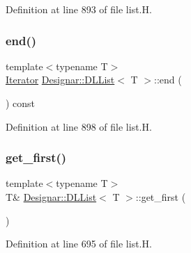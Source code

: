 Definition at line 893 of file list.\+H.

\mbox{\label{class_designar_1_1_d_l_list_a44bec24be9eb3b3bbfeadc28240a1650}} 
\subsubsection{\texorpdfstring{end()}{end()}\hspace{0.1cm}{\footnotesize\ttfamily [2/2]}}
{\footnotesize\ttfamily template$<$typename T$>$ \\
\hyperlink{class_designar_1_1_d_l_list_1_1_iterator}{Iterator} \hyperlink{class_designar_1_1_d_l_list}{Designar\+::\+D\+L\+List}$<$ T $>$\+::end (\begin{DoxyParamCaption}{ }\end{DoxyParamCaption}) const\hspace{0.3cm}{\ttfamily [inline]}}



Definition at line 898 of file list.\+H.

\mbox{\label{class_designar_1_1_d_l_list_aa089dc5d48f092cc91d2237606e131e7}} 
\subsubsection{\texorpdfstring{get\+\_\+first()}{get\_first()}\hspace{0.1cm}{\footnotesize\ttfamily [1/2]}}
{\footnotesize\ttfamily template$<$typename T$>$ \\
T\& \hyperlink{class_designar_1_1_d_l_list}{Designar\+::\+D\+L\+List}$<$ T $>$\+::get\+\_\+first (\begin{DoxyParamCaption}{ }\end{DoxyParamCaption})\hspace{0.3cm}{\ttfamily [inline]}}



Definition at line 695 of file list.\+H.

\mbox{\label{class_designar_1_1_d_l_list_a7dc30042ed6cd04f964504e2ff2e5653}} 
